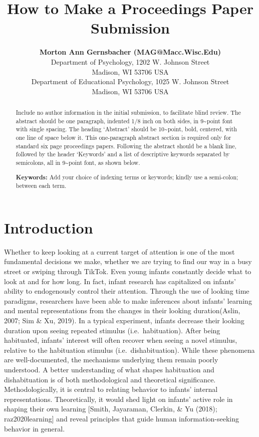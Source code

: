 \documentclass[10pt, letterpaper]{article}
\title{How to Make a Proceedings Paper Submission}
\author{{\large \bf Morton Ann Gernsbacher (MAG@Macc.Wisc.Edu)} \\ Department of Psychology, 1202 W. Johnson Street \\ Madison, WI 53706 USA \AND {\large \bf Sharon J.~Derry (SDJ@Macc.Wisc.Edu)} \\ Department of Educational Psychology, 1025 W. Johnson Street \\ Madison, WI 53706 USA}
\begin{document}
\maketitle

\begin{abstract}
Include no author information in the initial submission, to facilitate
blind review. The abstract should be one paragraph, indented 1/8 inch on
both sides, in 9\textasciitilde point font with single spacing. The
heading `Abstract' should be 10\textasciitilde point, bold, centered,
with one line of space below it. This one-paragraph abstract section is
required only for standard six page proceedings papers. Following the
abstract should be a blank line, followed by the header `Keywords' and a
list of descriptive keywords separated by semicolons, all in
9\textasciitilde point font, as shown below.

\textbf{Keywords:}
Add your choice of indexing terms or keywords; kindly use a semi-colon;
between each term.
\end{abstract}

\hypertarget{introduction}{%
\section{Introduction}\label{introduction}}

Whether to keep looking at a current target of attention is one of the
most fundamental decisions we make, whether we are trying to find our
way in a busy street or swiping through TikTok. Even young infants
constantly decide what to look at and for how long. In fact, infant
research has capitalized on infants' ability to endogenously control
their attention. Through the use of looking time paradigms, researchers
have been able to make inferences about infants' learning and mental
representations from the changes in their looking duration(Aslin, 2007;
Sim \& Xu, 2019). In a typical experiment, infants decrease their
looking duration upon seeing repeated stimulus (i.e.~habituation). After
being habituated, infants' interest will often recover when seeing a
novel stimulus, relative to the habituation stimulus
(i.e.~dishabituation). While these phenomena are well-documented, the
mechanisms underlying them remain poorly understood. A better
understanding of what shapes habituation and dishabituation is of both
methodological and theoretical significance. Methodologically, it is
central to relating behavior to infants' internal representations.
Theoretically, it would shed light on infants' active role in shaping
their own learning {[}Smith, Jayaraman, Clerkin, \& Yu (2018);
raz2020learning{]} and reveal principles that guide human
information-seeking behavior in general.
\end{document}
